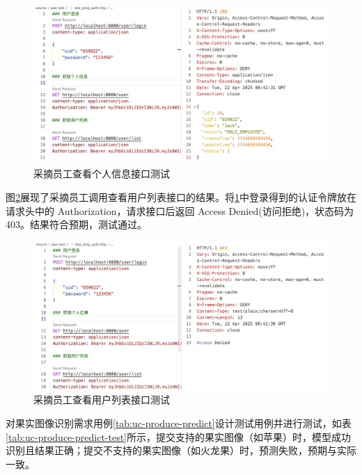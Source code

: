 \begin{figure}
    \centering
    \includegraphics[width=0.9\linewidth]{../result/rest-test-user-login-emp.png}
    \caption{采摘员工查看个人信息接口测试}
    \label{fig:rest-test-user-login-emp}
\end{figure}

图\ref{fig:rest-test-user-list-emp}展现了采摘员工调用查看用户列表接口的结果。将\ref{fig:rest-test-user-login-emp}中登录得到的认证令牌放在请求头中的 Authorization，请求接口后返回 Access Denied(访问拒绝)，状态码为 403。结果符合预期，测试通过。

\begin{figure}
    \centering
    \includegraphics[width=0.9\linewidth]{../result/rest-test-user-list-emp.png}
    \caption{采摘员工查看用户列表接口测试}
    \label{fig:rest-test-user-list-emp}
\end{figure}

对果实图像识别需求用例\ref{tab:uc-produce-predict}设计测试用例并进行测试，如表\ref{tab:uc-produce-predict-test}所示，提交支持的果实图像（如苹果）时，模型成功识别且结果正确；提交不支持的果实图像（如火龙果）时，预测失败，预期与实际一致。

